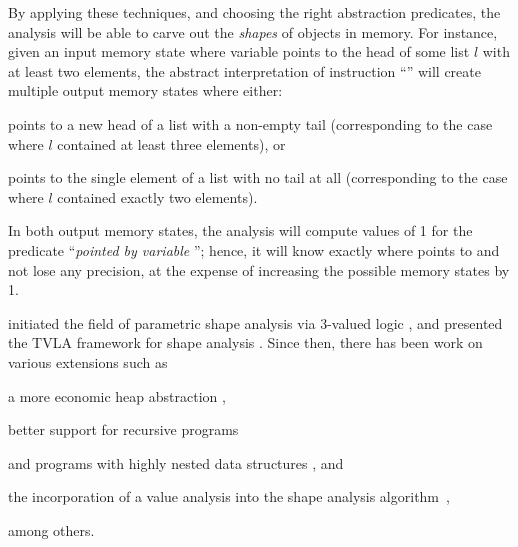 By applying these techniques, and choosing the right abstraction
predicates, the analysis will be able to carve out the \emph{shapes}
of objects in memory. For instance, given an input memory state where
variable  points to the head of some list \(l\) with at least
two elements, the abstract interpretation of instruction ``'' will create multiple output memory states where either:
\begin{inparaenum}[(i)]
\item {} points to a new head of a list with a non-empty tail
  (corresponding to the case where \(l\) contained at least three
  elements), or
\item {} points to the single element of a list with no tail at
  all (corresponding to the case where \(l\) contained exactly two
  elements).
\end{inparaenum}
In both output memory states, the analysis will compute values of 1
for the predicate ``\emph{pointed by variable }''; hence, it
will know exactly where  points to and not lose any precision,
at the expense of increasing the possible memory states by 1.

\citeauthor{popl/SagivRW99} initiated the field of parametric shape
analysis via 3-valued logic
\cite{toplas/SagivRW98,popl/SagivRW99,toplas/SagivRW02}, and
\citeauthor{sas/Lev-AmiS00} presented the TVLA framework for shape
analysis \cite{sas/Lev-AmiS00}. Since then, there has been work on
various extensions such as
\begin{inparablank}
\item a more economic heap abstraction \cite{sas/ManevichSRF04},
\item better support for recursive programs \cite{cc/RinetzkyS01}
\item and programs with highly nested data structures
  \cite{cav/BerdineCCDOWY07} , and
\item the incorporation of a value analysis into the shape analysis
  algorithm~\cite{sefm/FerraraFJ12},
\end{inparablank}
among others.



